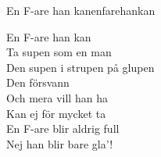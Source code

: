 \begin{song}{En F-are han kan}{enfarehankan}
\begin{vers}
En F-are han kan\\
Ta supen som en man\\
Den supen i strupen på glupen\\
Den försvann\\
Och mera vill han ha\\
Kan ej för mycket ta\\
En F-are blir aldrig full\\
Nej han blir bare gla'!\\
\end{vers}
\end{song}
